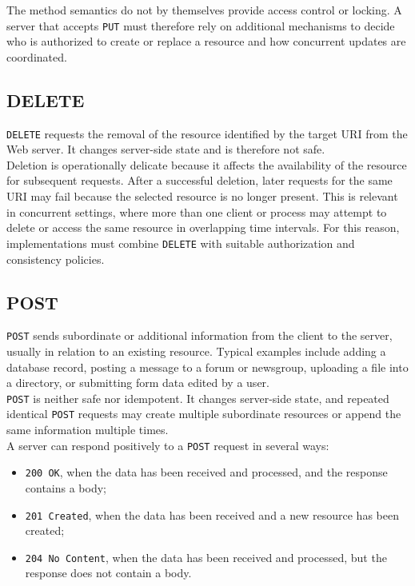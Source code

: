 \documentclass{scrbook}
\begin{document}
The method semantics do not by themselves provide access control or locking. A server that accepts \texttt{PUT} must therefore rely on additional mechanisms to decide who is authorized to create or replace a resource and how concurrent updates are coordinated.

\subsection{DELETE}

\texttt{DELETE} requests the removal of the resource identified by the target URI from the Web server. It changes server-side state and is therefore not safe.\\

Deletion is operationally delicate because it affects the availability of the resource for subsequent requests. After a successful deletion, later requests for the same URI may fail because the selected resource is no longer present. This is relevant in concurrent settings, where more than one client or process may attempt to delete or access the same resource in overlapping time intervals. For this reason, implementations must combine \texttt{DELETE} with suitable authorization and consistency policies.

\subsection{POST}

\texttt{POST} sends subordinate or additional information from the client to the server, usually in relation to an existing resource. Typical examples include adding a database record, posting a message to a forum or newsgroup, uploading a file into a directory, or submitting form data edited by a user.\\

\texttt{POST} is neither safe nor idempotent. It changes server-side state, and repeated identical \texttt{POST} requests may create multiple subordinate resources or append the same information multiple times.\\

A server can respond positively to a \texttt{POST} request in several ways:
\begin{itemize}
    \item \texttt{200 OK}, when the data has been received and processed, and the response contains a body;
    \item \texttt{201 Created}, when the data has been received and a new resource has been created;
    \item \texttt{204 No Content}, when the data has been received and processed, but the response does not contain a body.
\end{itemize}
\end{document}
